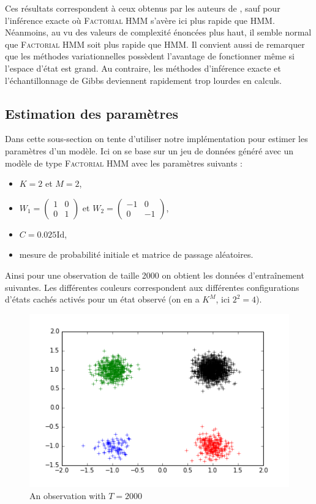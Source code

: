 \documentclass[10pt,a4paper]{article}
\newcommand{\hmm}{\textsc{HMM}}
\newcommand{\fhmm}{\textsc{Factorial HMM}}
\begin{document}
Ces résultats correspondent à ceux obtenus par les auteurs de
\cite{ghahramani1997factorial}, sauf pour l'inférence exacte où \fhmm{} s'avère
ici plus rapide que \hmm{}.
Néanmoins, au vu des valeurs de complexité énoncées plus haut, il semble normal
que \fhmm{} soit plus rapide que \hmm{}. Il convient aussi de remarquer que
les méthodes variationnelles possèdent l'avantage de fonctionner même si
l'espace d'état est grand.
Au contraire, les méthodes d'inférence exacte et l'échantillonnage de Gibbs
deviennent rapidement trop lourdes en calculs.

\subsection{Estimation des paramètres}

Dans cette sous-section on tente d'utiliser notre implémentation pour estimer
les paramètres d'un modèle.
Ici on se base sur un jeu de données généré avec un modèle de type \fhmm{} avec
les paramètres suivants :

\begin{itemize}
 \item $K=2$ et $M=2$,
 \item $W_1 = \left( \begin{matrix}
 1 & 0 \\
 0 & 1
 \end{matrix} \right)$ et $W_2 = \left( \begin{matrix}
 -1 & 0 \\
 0 & -1
 \end{matrix} \right)$,
 \item $C=0.025 \text{Id}$,
 \item mesure de probabilité initiale et matrice de passage aléatoires.
 \end{itemize}
 
 Ainsi pour une observation de taille 2000 on obtient les données
d'entra\^{i}nement suivantes.
Les différentes couleurs correspondent aux différentes configurations d'états
cachés activés pour un état observé (on en a $K^M$, ici $2^2=4$).

\begin{figure}[H]
\centering
\includegraphics[scale=0.3]{../resources/pictures/synthetic_data.png}
\caption{An observation with $T= 2000$\label{fig:data}}
\end{figure} 
\end{document}
